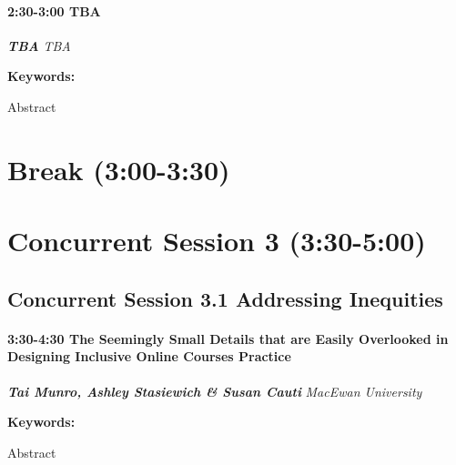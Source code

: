 \documentclass[
]{book}
\begin{document}
\begin{session}
\hypertarget{tba}{%
\paragraph*{\texorpdfstring{2:30-3:00 \textbar{} \textbf{TBA}
\textbar{}}{2:30-3:00 \textbar{} TBA \textbar{}}}\label{tba}}

\textbf{\emph{TBA}} \textbar{} \emph{TBA}

\textbf{Keywords:}

Abstract
\end{session}

\hypertarget{break-300-330}{%
\section*{Break (3:00-3:30)}\label{break-300-330}}

\hypertarget{concurrent-session-3-330-500}{%
\section*{Concurrent Session 3 (3:30-5:00)}\label{concurrent-session-3-330-500}}

\hypertarget{concurrent-session-3.1-addressing-inequities}{%
\subsection*{Concurrent Session 3.1 \textbar{} Addressing Inequities}\label{concurrent-session-3.1-addressing-inequities}}

\begin{session}
\hypertarget{the-seemingly-small-details-that-are-easily-overlooked-in-designing-inclusive-online-courses-practice}{%
\paragraph*{\texorpdfstring{3:30-4:30 \textbar{} \textbf{The Seemingly
Small Details that are Easily Overlooked in Designing Inclusive Online
Courses} \textbar{}
Practice}{3:30-4:30 \textbar{} The Seemingly Small Details that are Easily Overlooked in Designing Inclusive Online Courses \textbar{} Practice}}\label{the-seemingly-small-details-that-are-easily-overlooked-in-designing-inclusive-online-courses-practice}}

\textbf{\emph{Tai Munro, Ashley Stasiewich \& Susan Cauti}} \textbar{}
\emph{MacEwan University}

\textbf{Keywords:}

Abstract
\end{session}
\end{document}
